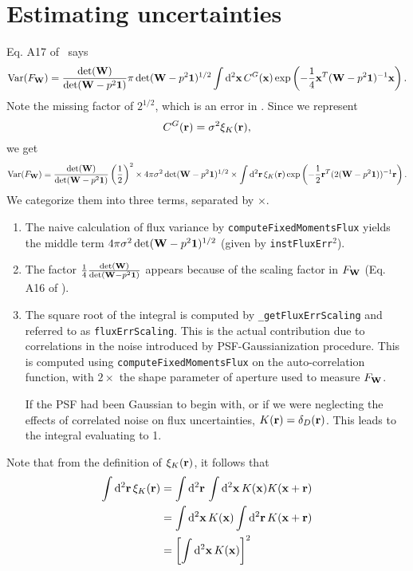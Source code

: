 \documentclass[DM,lsstdraft, authoryear,toc]{lsstdoc}
\newcommand{\rmd}{\mathrm{d}^2}
\begin{document}
\section{Estimating uncertainties}
Eq. A17 of~\cite{Kuijken2015} says
\begin{equation}
    \text{Var}(F_{\bf W}) = \frac{\det({\bf W})}{\det({\bf W}-p^2\bf{1})} \pi \det({\bf W}-p^2{\bf 1})^{1/2} \int\rmd {\bf x}\, C^G({\bf x}) \exp\left(-\frac{1}{4}{\bf x}^T({\bf W}-p^2{\bf 1})^{-1}{\bf x}\right).
    \label{eq:A17}
\end{equation}
Note the missing factor of $2^{1/2}$, which is an error in \cite{Kuijken2015}.
Since we represent
\begin{equation}
    C^G({\bf r}) = \sigma^2 \xi_{K}({\bf r}),
\end{equation}
we get
\begin{equation}
  \text{Var}(F_{\bf W}) = \frac{\det({\bf W})}{\det({\bf W}-p^2\bf{1})}\left(\frac{1}{2}\right)^2 \times 4\pi \sigma^2 \det({\bf W}-p^2{\bf 1})^{1/2} \times \int\rmd {\bf r}\, \xi_{K}({\bf r}) \exp\left(-\frac{1}{2}{\bf r}^T(2({\bf W}-p^2{\bf 1}))^{-1}{\bf r}\right).
\end{equation}
We categorize them into three terms, separated by $\times$. 
\begin{enumerate}
  \item The naive calculation of flux variance by \texttt{computeFixedMomentsFlux} yields the middle term $4\pi \sigma^2 \det({\bf W}-p^2{\bf 1})^{1/2}$ (given by \texttt{instFluxErr}$^2$).
  \item The factor $\frac{1}{4}\frac{\det({\bf W})}{\det({\bf W}-p^2\bf{1})}$ appears because of the scaling factor in $F_{\bf W}$ (Eq. A16 of \cite{Kuijken2015}).
  \item The square root of the integral is computed by \texttt{\_getFluxErrScaling} and referred to as \texttt{fluxErrScaling}. This is the actual contribution due to correlations in the noise introduced by PSF-Gaussianization procedure. This is computed using \texttt{computeFixedMomentsFlux} on the auto-correlation function, with $2 \times$ the shape parameter of aperture used to measure $F_{\bf W}$.
  
  If the PSF had been Gaussian to begin with, or if we were neglecting the effects of correlated noise on flux uncertainties, $K({\bf r}) = \delta_D({\bf r})$. This leads to the integral evaluating to 1.
\end{enumerate}

Note that from the definition of $\xi_K({\bf r})$, it follows that
\begin{align}
  \int\rmd{\bf r}\, \xi_K({\bf r}) &= \int\rmd{\bf r}\, \int\rmd{\bf x}\, K({\bf x})K({\bf x}+{\bf r})\\ 
                                   &= \int\rmd{\bf x}\, K({\bf x}) \int\rmd{\bf r}\, K({\bf x}+{\bf r})\\
                                   &= \left[ \int\rmd{\bf x}\, K({\bf x})\right]^2
                                   \label{eq:integral_acf}
\end{align}
\end{document}
